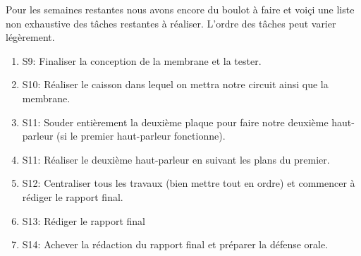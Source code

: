 Pour les semaines restantes nous avons encore du boulot à faire et voiçi une liste non exhaustive des tâches restantes à réaliser.
L'ordre des tâches peut varier légèrement.
\begin{enumerate}

\item{S9}: Finaliser la conception de la membrane et la tester.
\item{S10}: Réaliser le caisson dans lequel on mettra notre circuit ainsi que la membrane.
\item{S11}: Souder entièrement la deuxième plaque pour faire notre deuxième haut-parleur (si le premier haut-parleur fonctionne).
\item{S11}: Réaliser le deuxième haut-parleur en suivant les plans du premier.
\item{S12}: Centraliser tous les travaux (bien mettre tout en ordre) et commencer à rédiger le rapport final.
\item{S13}: Rédiger le rapport final
\item{S14}: Achever la rédaction du rapport final et préparer la défense orale.
\end{enumerate}




